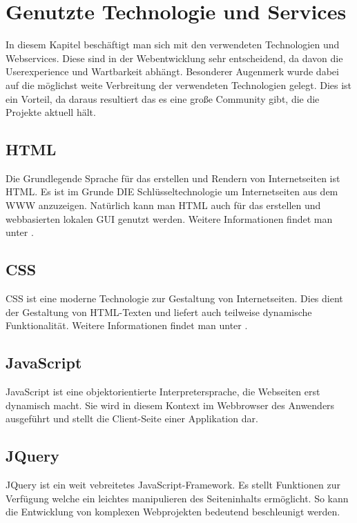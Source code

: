 \chapter{ Genutzte Technologie und Services}

In diesem Kapitel beschäftigt man sich mit den verwendeten Technologien und Webservices. Diese sind in der Webentwicklung sehr entscheidend, da davon die Userexperience und Wartbarkeit abhängt. Besonderer Augenmerk wurde dabei auf die möglichst weite Verbreitung der verwendeten Technologien gelegt. Dies ist ein Vorteil, da daraus resultiert das es eine große Community gibt, die die Projekte aktuell hält.

\section{HTML}
Die Grundlegende Sprache für das erstellen und Rendern von Internetseiten ist \ac{HTML}. Es ist im Grunde DIE Schlüsseltechnologie um Internetseiten aus dem \ac{WWW} anzuzeigen. Natürlich kann man \ac{HTML} auch für das erstellen und webbasierten lokalen \ac{GUI} genutzt werden. Weitere Informationen findet man unter  \cite{Duckett2011}.


\section{CSS}

\ac{CSS} ist eine moderne Technologie zur Gestaltung von Internetseiten. Dies dient der Gestaltung von HTML-Texten und liefert auch teilweise dynamische Funktionalität. Weitere Informationen findet man unter  \cite{Wyke-Smith2013}.

\section{JavaScript}

JavaScript ist eine objektorientierte  Interpretersprache, die Webseiten erst dynamisch macht. Sie wird in diesem Kontext im Webbrowser des Anwenders ausgeführt und stellt die Client-Seite einer Applikation dar. \cite{Flanagan2011}

\section{JQuery}

JQuery ist ein weit vebreitetes JavaScript-Framework. Es stellt  Funktionen zur Verfügung welche ein leichtes manipulieren des Seiteninhalts ermöglicht. So kann die Entwicklung von komplexen Webprojekten bedeutend beschleunigt werden.\cite{Delamater2017} 


